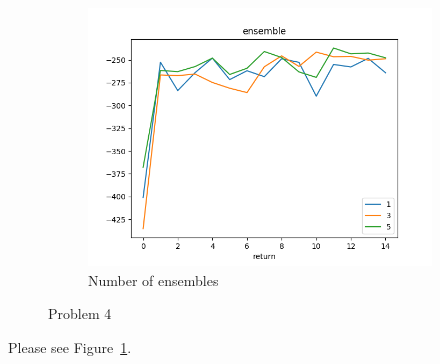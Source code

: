 \begin{figure}[htbp]
\begin{subfigure}[b]{0.3\linewidth}
        \includegraphics[width=1.0\linewidth]{figures/p4-en.png}
        \caption{Number of ensembles}
    \end{subfigure}
    \caption{Problem 4}
    \label{fig:p4}
\end{figure}

Please see Figure~\ref{fig:p4}.